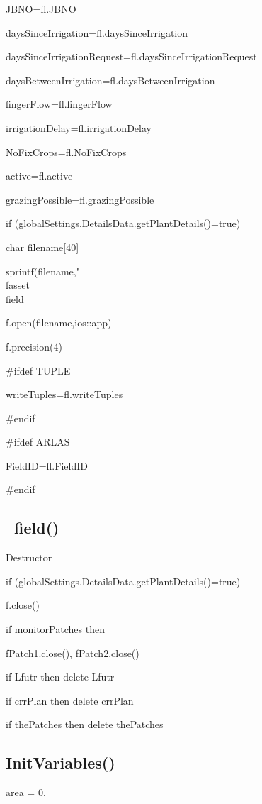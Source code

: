\documentclass[%
]{scrartcl}
\begin{document}
   JBNO=fl.JBNO
   
   daysSinceIrrigation=fl.daysSinceIrrigation
   
   daysSinceIrrigationRequest=fl.daysSinceIrrigationRequest
  
   daysBetweenIrrigation=fl.daysBetweenIrrigation
  
   fingerFlow=fl.fingerFlow
 
 	irrigationDelay=fl.irrigationDelay
  
  	NoFixCrops=fl.NoFixCrops
  
   active=fl.active

   grazingPossible=fl.grazingPossible
   
   if (globalSettings.DetailsData.getPlantDetails()=true)
   
      \quad  char filename[40]
       
        \quad
      sprintf(filename,"\\fasset\\field%

       \quad f.open(filename,ios::app)
       
       \quad f.precision(4)
   
\#ifdef TUPLE

   writeTuples=fl.writeTuples
   
\#endif

\#ifdef ARLAS

   FieldID=fl.FieldID
   
\#endif


\subsection{~field()}
Destructor

   if (globalSettings.DetailsData.getPlantDetails()=true)
   
    \quad    f.close()
      
   if monitorPatches then
   
     \quad   fPatch1.close(),
      fPatch2.close()

   if Lfutr	then delete Lfutr

	if crrPlan then delete crrPlan
  
   if thePatches then   delete thePatches


\subsection{InitVariables()}
area = 0, 
\end{document}
